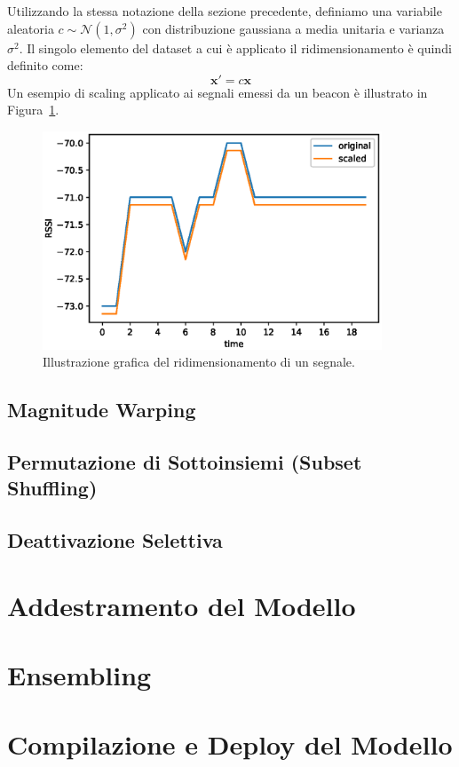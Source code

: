Utilizzando la stessa notazione della sezione precedente, definiamo una
variabile aleatoria \(c \sim \mathcal{N}(1, \sigma^2)\) con distribuzione
gaussiana a media unitaria e varianza \(\sigma^2\). Il singolo elemento del
dataset a cui è applicato il ridimensionamento è quindi definito come:
\[ \bm x' = c \bm x \] 
Un esempio di scaling applicato ai segnali emessi da un beacon è illustrato in
Figura~\ref{fig:scaling}.
\begin{figure}[!htp]
  \centering\includegraphics[width=0.9\textwidth]{./img/scaling.eps}
  \caption{Illustrazione grafica del ridimensionamento di un segnale.}%
  \label{fig:scaling}%
\end{figure}


\subsection{Magnitude Warping}
\subsection{Permutazione di Sottoinsiemi (Subset Shuffling)}
\subsection{Deattivazione Selettiva}
\section{Addestramento del Modello}
\section{Ensembling}
\section{Compilazione e Deploy del Modello}


